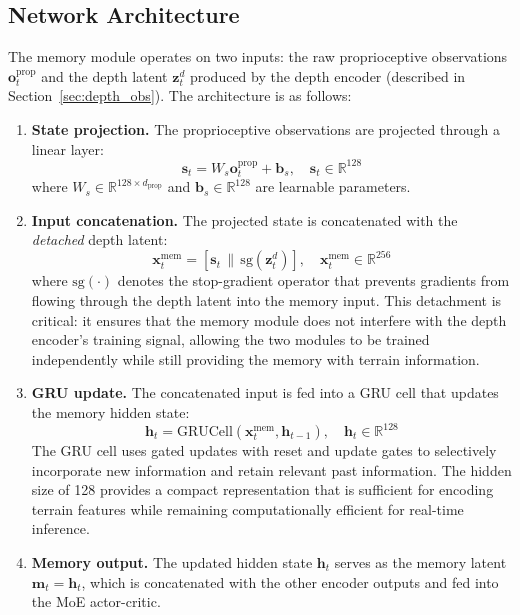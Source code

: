 \subsection{Network Architecture}

The memory module operates on two inputs: the raw proprioceptive observations $\mathbf{o}_t^{\text{prop}}$ and the depth latent $\mathbf{z}_t^d$ produced by the depth encoder (described in Section~\ref{sec:depth_obs}). The architecture is as follows:

\begin{enumerate}
    \item \textbf{State projection.} The proprioceptive observations are projected through a linear layer:
    \begin{equation}
        \mathbf{s}_t = W_s \mathbf{o}_t^{\text{prop}} + \mathbf{b}_s, \quad \mathbf{s}_t \in \mathbb{R}^{128}
    \end{equation}
    where $W_s \in \mathbb{R}^{128 \times d_{\text{prop}}}$ and $\mathbf{b}_s \in \mathbb{R}^{128}$ are learnable parameters.

    \item \textbf{Input concatenation.} The projected state is concatenated with the \emph{detached} depth latent:
    \begin{equation}
        \mathbf{x}_t^{\text{mem}} = [\mathbf{s}_t \, \| \, \text{sg}(\mathbf{z}_t^d)], \quad \mathbf{x}_t^{\text{mem}} \in \mathbb{R}^{256}
    \end{equation}
    where $\text{sg}(\cdot)$ denotes the stop-gradient operator that prevents gradients from flowing through the depth latent into the memory input. This detachment is critical: it ensures that the memory module does not interfere with the depth encoder's training signal, allowing the two modules to be trained independently while still providing the memory with terrain information.

    \item \textbf{GRU update.} The concatenated input is fed into a GRU cell that updates the memory hidden state:
    \begin{equation}
        \mathbf{h}_t = \text{GRUCell}(\mathbf{x}_t^{\text{mem}}, \mathbf{h}_{t-1}), \quad \mathbf{h}_t \in \mathbb{R}^{128}
    \end{equation}
    The GRU cell uses gated updates with reset and update gates to selectively incorporate new information and retain relevant past information. The hidden size of 128 provides a compact representation that is sufficient for encoding terrain features while remaining computationally efficient for real-time inference.

    \item \textbf{Memory output.} The updated hidden state $\mathbf{h}_t$ serves as the memory latent $\mathbf{m}_t = \mathbf{h}_t$, which is concatenated with the other encoder outputs and fed into the MoE actor-critic.
\end{enumerate}

